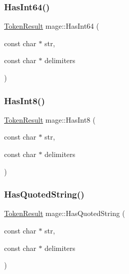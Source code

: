 \hypertarget{namespacemage_a59d8d6302b2f0cd017dfa2217ac536b0}{}\label{namespacemage_a59d8d6302b2f0cd017dfa2217ac536b0} 
\subsubsection{\texorpdfstring{Has\+Int64()}{HasInt64()}}
{\footnotesize\ttfamily \hyperlink{namespacemage_a2178ba2411db5912f41b2e7698c2037d}{Token\+Result} mage\+::\+Has\+Int64 (\begin{DoxyParamCaption}\item[{const char $\ast$}]{str,  }\item[{const char $\ast$}]{delimiters }\end{DoxyParamCaption})}

\hypertarget{namespacemage_aeb74d3691c0033e4df9a4dd3aec28f14}{}\label{namespacemage_aeb74d3691c0033e4df9a4dd3aec28f14} 
\subsubsection{\texorpdfstring{Has\+Int8()}{HasInt8()}}
{\footnotesize\ttfamily \hyperlink{namespacemage_a2178ba2411db5912f41b2e7698c2037d}{Token\+Result} mage\+::\+Has\+Int8 (\begin{DoxyParamCaption}\item[{const char $\ast$}]{str,  }\item[{const char $\ast$}]{delimiters }\end{DoxyParamCaption})}

\hypertarget{namespacemage_aae5d7c6c8ff6dcd039a3c5afaafeb241}{}\label{namespacemage_aae5d7c6c8ff6dcd039a3c5afaafeb241} 
\subsubsection{\texorpdfstring{Has\+Quoted\+String()}{HasQuotedString()}}
{\footnotesize\ttfamily \hyperlink{namespacemage_a2178ba2411db5912f41b2e7698c2037d}{Token\+Result} mage\+::\+Has\+Quoted\+String (\begin{DoxyParamCaption}\item[{const char $\ast$}]{str,  }\item[{const char $\ast$}]{delimiters }\end{DoxyParamCaption})}

